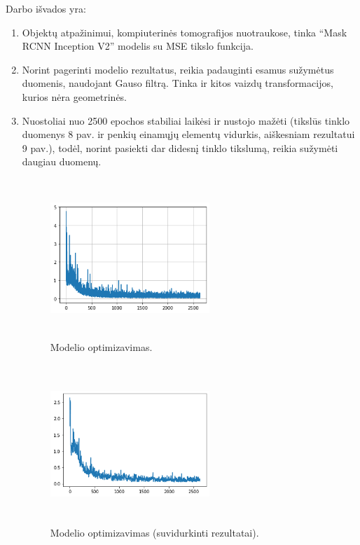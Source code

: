 \documentclass{VUMIFInfKursinis}
\begin{document}
\par
Darbo išvados yra:
\begin{enumerate}
\item Objektų atpažinimui, kompiuterinės tomografijos nuotraukose, tinka \enquote{Mask RCNN Inception V2} modelis su MSE tikslo funkcija.



\item Norint pagerinti modelio rezultatus, reikia padauginti esamus sužymėtus duomenis, naudojant Gauso filtrą. Tinka ir kitos vaizdų transformacijos, kurios nėra geometrinės.

\item Nuostoliai nuo 2500 epochos stabiliai laikėsi ir nustojo mažėti (tikslūs tinklo duomenys 8 pav. ir penkių einamųjų elementų vidurkis, aiškesniam rezultatui 9 pav.), todėl, norint
pasiekti dar didesnį tinklo tikslumą, reikia sužymėti daugiau duomenų.

\begin{figure}[!h]
  \centering
  \includegraphics[width=6cm,height=6cm,keepaspectratio]{neislygintas.png}
  \caption{Modelio optimizavimas.}
  \label{fig:kaukė1}
\end{figure}

\begin{figure}[!h]
  \centering
  \includegraphics[width=6cm,height=6cm,keepaspectratio]{normalizuotas.png}
  \caption{Modelio optimizavimas (suvidurkinti rezultatai).}
  \label{fig:kaukė1}
\end{figure}


\end{enumerate}
\end{document}
